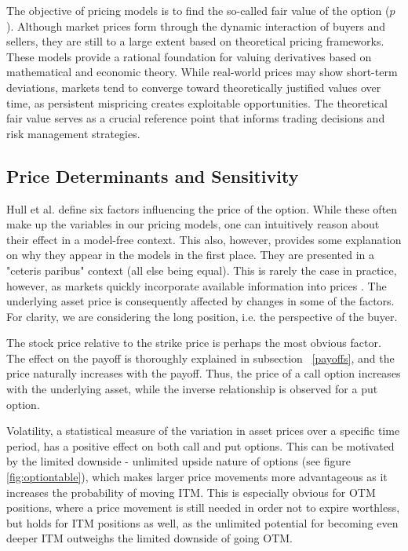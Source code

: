 \documentclass[english,12pt,a4paper,pdftex,sci,utf8]{aaltothesis}
\begin{document}
The objective of pricing models is to find the so-called fair value of the option ($p$). Although market prices form through the dynamic interaction of buyers and sellers, they are still to a large extent based on theoretical pricing frameworks. These models provide a rational foundation for valuing derivatives based on mathematical and economic theory. While real-world prices may show short-term deviations, markets tend to converge toward theoretically justified values over time, as persistent mispricing creates exploitable opportunities. The theoretical fair value serves as a crucial reference point that informs trading decisions and risk management strategies.


\subsection{Price Determinants and Sensitivity}

Hull et al. \cite{hull2013fundamentals} define six factors influencing the price of the option. While these often make up the variables in our pricing models, one can intuitively reason about their effect in a model-free context. This also, however, provides some explanation on why they appear in the models in the first place. They are presented in a "ceteris paribus" context (all else being equal). This is rarely the case in practice, however, as markets quickly incorporate available information into prices \cite{fama1970efficient}. The underlying asset price is consequently affected by changes in some of the factors. For clarity, we are considering the long position, i.e. the perspective of the buyer.

The stock price relative to the strike price is perhaps the most obvious factor. The effect on the payoff is thoroughly explained in subsection ~\ref{payoffs}, and the price naturally increases with the payoff. Thus, the price of a call option increases with the underlying asset, while the inverse relationship is observed for a put option.

Volatility, a statistical measure of the variation in asset prices over a specific time period, has a positive effect on both call and put options. This can be motivated by the limited downside - unlimited upside nature of options (see figure \ref{fig:optiontable}), which makes larger price movements more advantageous as it increases the probability of moving ITM. This is especially obvious for OTM positions, where a price movement is still needed in order not to expire worthless, but holds for ITM positions as well, as the unlimited potential for becoming even deeper ITM outweighs the limited downside of going OTM.
\end{document}
